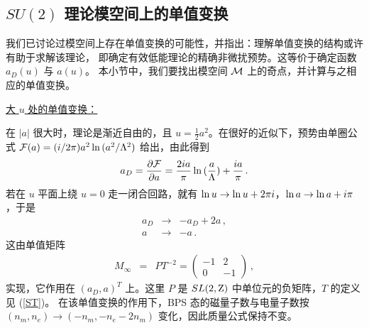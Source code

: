
\subsection{$SU(2)$ 理论模空间上的单值变换}

我们已讨论过模空间上存在单值变换的可能性，并指出：理解单值变换的结构或许有助于求解该理论，
即确定有效低能理论的精确非微扰预势。这等价于确定函数 $a_D(u)$ 与 $a(u)$。
本小节中，我们要找出模空间 ${\cal M}$ 上的奇点，并计算与之相应的单值变换。


\noindent\underline{大 $u$ 处的单值变换：}

在 $|a|$ 很大时，理论是渐近自由的，且 $u=\frac{1}{2}a^2$。在很好的近似下，预势由单圈公式
${\cal F}(a)=(i/2\pi)a^2\,{\rm ln}\, (a^2/\Lambda^2)$ 给出，由此得到
$$
a_D=\frac{\partial{\cal F}}{\partial a}=
\frac{2ia}{\pi}\,{\rm ln}\,(\frac{a}{\Lambda})+\frac{ia}{\pi}\,.
$$
若在 $u$ 平面上绕 $u=0$ 走一闭合回路，就有
${\rm ln}\,u \rightarrow {\rm ln}\,u+2\pi i$，${\rm ln}\,a \rightarrow {\rm ln}\,a+i\pi$，于是
$$
\begin{array}{rcl}
a_D & \rightarrow & - a_D + 2a \,,\\
a & \rightarrow & - a \,.
\end{array}
$$
这由单值矩阵
\begin{eqnarray}
M_{\infty}&=& PT^{-2}=\left(\begin{array}{cc}
-1 & 2 \\ 0 & -1 \end{array} \right )\,,
\label{mondone}
\end{eqnarray}
实现，它作用在 $(a_D, a)^T$ 上。这里 $P$ 是 $SL(2,{\rm Z})$ 中单位元的负矩阵，$T$ 的定义见 (\ref{ST})。
在该单值变换的作用下，BPS 态的磁量子数与电量子数按
$(n_m,n_e)\rightarrow (-n_m,-n_e-2n_m)$ 变化，因此质量公式保持不变。

